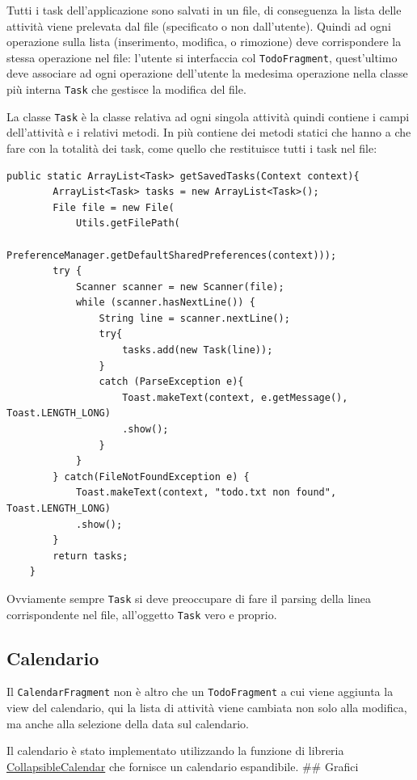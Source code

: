 \documentclass[]{article}
\begin{document}
Tutti i task dell'applicazione sono salvati in un file, di conseguenza
la lista delle attività viene prelevata dal file (specificato o non
dall'utente). Quindi ad ogni operazione sulla lista (inserimento,
modifica, o rimozione) deve corrispondere la stessa operazione nel file:
l'utente si interfaccia col \texttt{TodoFragment}, quest'ultimo deve
associare ad ogni operazione dell'utente la medesima operazione nella
classe più interna \texttt{Task} che gestisce la modifica del file.

La classe \texttt{Task} è la classe relativa ad ogni singola attività
quindi contiene i campi dell'attività e i relativi metodi. In più
contiene dei metodi statici che hanno a che fare con la totalità dei
task, come quello che restituisce tutti i task nel file:

\begin{verbatim}
public static ArrayList<Task> getSavedTasks(Context context){
        ArrayList<Task> tasks = new ArrayList<Task>();
        File file = new File(
            Utils.getFilePath(
                PreferenceManager.getDefaultSharedPreferences(context)));
        try {
            Scanner scanner = new Scanner(file);
            while (scanner.hasNextLine()) {
                String line = scanner.nextLine();
                try{
                    tasks.add(new Task(line));
                }
                catch (ParseException e){
                    Toast.makeText(context, e.getMessage(), Toast.LENGTH_LONG)
                    .show();
                }
            }
        } catch(FileNotFoundException e) {
            Toast.makeText(context, "todo.txt non found", Toast.LENGTH_LONG)
            .show();
        }
        return tasks;
    }
\end{verbatim}

Ovviamente sempre \texttt{Task} si deve preoccupare di fare il parsing
della linea corrispondente nel file, all'oggetto \texttt{Task} vero e
proprio.

\hypertarget{calendario-1}{%
\subsection{Calendario}\label{calendario-1}}

Il \texttt{CalendarFragment} non è altro che un \texttt{TodoFragment} a
cui viene aggiunta la view del calendario, qui la lista di attività
viene cambiata non solo alla modifica, ma anche alla selezione della
data sul calendario.

Il calendario è stato implementato utilizzando la funzione di libreria
\href{https://github.com/shrikanth7698/Collapsible-Calendar-View-Android}{CollapsibleCalendar}
che fornisce un calendario espandibile. \#\# Grafici
\end{document}
